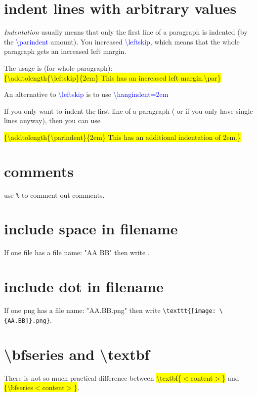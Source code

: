 \section{indent lines with arbitrary values}
\textit{Indentation} usually means that only the first line of a paragraph is indented (by the \textcolor{blue}{\textbackslash parindent} amount). You increased \textcolor{blue}{\textbackslash leftskip}, which means that the whole paragraph gets an increased left margin.

The usage is (for whole paragraph):\\
\colorbox{yellow}{\{\textbackslash addtolength\{\textbackslash leftskip\}\{2em\} This has an increased left margin.\textbackslash par\}}

An alternative to \textcolor{blue}{\textbackslash leftskip} is to use \textcolor{blue}{\textbackslash hangindent=2em}

If you only want to indent the first line of a paragraph ( or if you only have single lines anyway), then you can use

\colorbox{yellow}{\{\textbackslash addtolength\{\textbackslash parindent\}\{2em\} This has an additional indentation of 2em.\}}

\section{comments}
use \verb|%| to comment out comments.

\section{include space in filename}
If one file has a file name: "AA BB" then write \verb||.

\section{include dot in filename}
If one png has a file name: "AA.BB.png" then write \verb|\texttt{[image: \{AA.BB]}.png}|.

\section{\textbackslash bfseries and \textbackslash textbf}
There is not so much practical difference between \colorbox{yellow}{\textbackslash textbf\{$ < $content$ > $\}} and \colorbox{yellow}{\{\textbackslash bfseries$ < $content$ > $\}}. 


